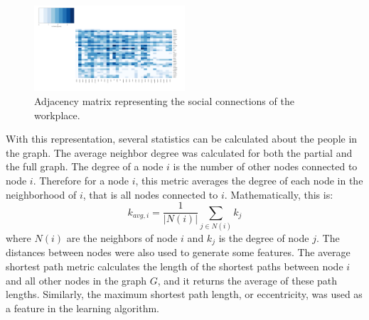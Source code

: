 \documentclass{article}
\begin{document}
\begin{figure}[H]
    \centering
        \includegraphics[width=0.5\textwidth]{adj_matrix}
        \caption{Adjacency matrix representing the social connections of the workplace.}
        \label{fig:adj_matrix}
\end{figure}

With this representation, several statistics can be calculated about the people in the graph.  The average neighbor degree was calculated for both the partial and the full graph.  The degree of a node $i$ is the number of other nodes connected to node $i$.  Therefore for a node $i$, this metric averages the degree of each node in the neighborhood of $i$, that is all nodes connected to $i$.  Mathematically, this is:
\begin{equation}
k_{avg,i} = \frac{1}{|N(i)|}\sum_{j \in N(i)}k_j
\end{equation}
where $N(i)$ are the neighbors of node $i$ and $k_j$ is the degree of node $j$.
The distances between nodes were also used to generate some features.  The average shortest path metric calculates the length of the shortest paths between node $i$ and all other nodes in the graph $G$, and it returns the average of these path lengths.  Similarly, the maximum shortest path length, or eccentricity, was used as a feature in the learning algorithm.  
\par
\end{document}
